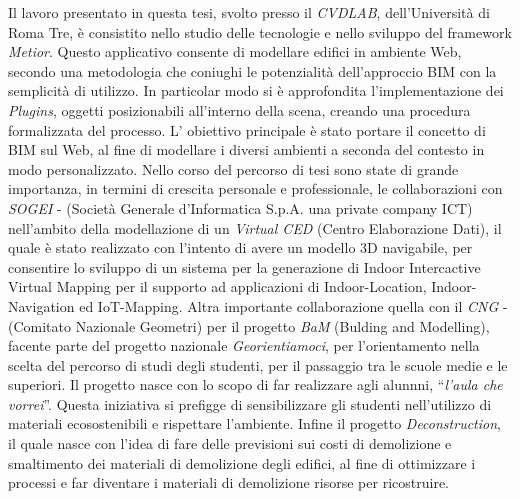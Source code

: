Il lavoro presentato in questa tesi, svolto presso il \emph{CVDLAB},
dell'Università di Roma Tre, è consistito nello studio delle tecnologie e nello sviluppo del
framework \emph{Metior}.
Questo applicativo consente di modellare edifici in ambiente Web, secondo una metodologia che coniughi le potenzialità
dell’approccio BIM con la semplicità di utilizzo.
In particolar modo si è approfondita l'implementazione dei \emph{Plugins}, oggetti posizionabili all'interno della scena, creando
una procedura formalizzata del processo.
L' obiettivo principale è stato portare il concetto di BIM sul Web, al fine di modellare i diversi ambienti a seconda del
contesto in modo personalizzato.
Nello corso del percorso di tesi sono state di grande importanza, in termini di crescita personale e professionale,
le collaborazioni con \emph{SOGEI} - (Società Generale d'Informatica S.p.A. una private company ICT)
nell'ambito della modellazione di un \emph{Virtual CED} (Centro Elaborazione Dati),
il quale \`e stato realizzato con l'intento di avere un modello 3D navigabile, per consentire lo sviluppo di un sistema per
la generazione di Indoor Intercactive Virtual Mapping per il supporto ad applicazioni di Indoor-Location, Indoor-Navigation
ed IoT-Mapping.
Altra importante collaborazione quella con il \emph{CNG} - (Comitato Nazionale Geometri) per il progetto \emph{BaM} (Bulding and Modelling),
facente parte del progetto nazionale \emph{Georientiamoci}, per l'orientamento nella scelta del percorso di studi degli studenti,
per il passaggio tra le scuole medie e le superiori.
Il progetto nasce con lo scopo di far realizzare agli alunnni, ``\emph{l'aula che vorrei}''.
Questa iniziativa si prefigge di sensibilizzare gli studenti nell'utilizzo di
materiali ecosostenibili e rispettare l'ambiente.
Infine il progetto \emph{Deconstruction}, il quale nasce con l'idea di fare delle previsioni
sui costi di demolizione e smaltimento dei materiali di demolizione degli edifici, al fine di ottimizzare i processi e far
diventare i materiali di demolizione risorse per ricostruire.
